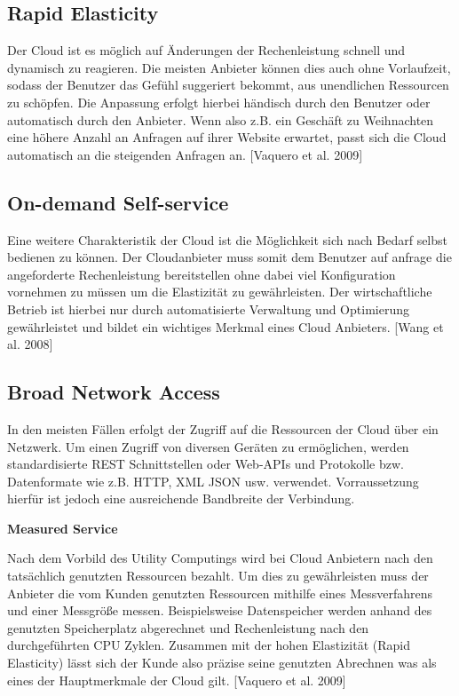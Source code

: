 \subsection{Rapid Elasticity}
Der Cloud ist es möglich auf Änderungen der Rechenleistung schnell und dynamisch zu reagieren. Die meisten Anbieter können dies auch ohne Vorlaufzeit, sodass der Benutzer das Gefühl suggeriert bekommt, aus unendlichen Ressourcen zu schöpfen. Die Anpassung erfolgt hierbei händisch durch den Benutzer oder automatisch durch den Anbieter. Wenn also z.B. ein Geschäft zu Weihnachten eine höhere Anzahl an Anfragen auf ihrer Website erwartet, passt sich die Cloud automatisch an die steigenden Anfragen an.
    [Vaquero et al. 2009]%
\subsection{On-demand Self-service}
Eine weitere Charakteristik der Cloud ist die Möglichkeit sich nach Bedarf selbst bedienen  zu können. Der Cloudanbieter muss somit dem Benutzer auf anfrage die angeforderte Rechenleistung bereitstellen ohne dabei viel Konfiguration vornehmen zu müssen um die Elastizität zu gewährleisten. Der wirtschaftliche Betrieb ist hierbei nur durch automatisierte Verwaltung und Optimierung gewährleistet und bildet ein wichtiges Merkmal eines Cloud Anbieters.
    [Wang et al. 2008]%
\subsection{Broad Network Access}
In den meisten Fällen erfolgt der Zugriff auf die Ressourcen der Cloud über ein Netzwerk. Um einen Zugriff von diversen Geräten zu ermöglichen, werden standardisierte REST Schnittstellen oder Web-APIs und Protokolle bzw. Datenformate wie z.B. HTTP, XML JSON usw. verwendet. Vorraussetzung hierfür ist jedoch eine ausreichende Bandbreite der Verbindung.

\textbf{Measured Service}

Nach dem Vorbild des Utility Computings wird bei Cloud Anbietern nach den tatsächlich genutzten Ressourcen bezahlt. Um dies zu gewährleisten muss der Anbieter die vom Kunden genutzten Ressourcen mithilfe eines Messverfahrens und einer Messgröße messen. Beispielsweise Datenspeicher werden anhand des genutzten Speicherplatz abgerechnet und Rechenleistung nach den durchgeführten CPU Zyklen. Zusammen mit der hohen Elastizität (Rapid Elasticity) lässt sich der Kunde also präzise seine  genutzten Abrechnen was als eines der Hauptmerkmale der Cloud gilt.
    [Vaquero et al. 2009]%

